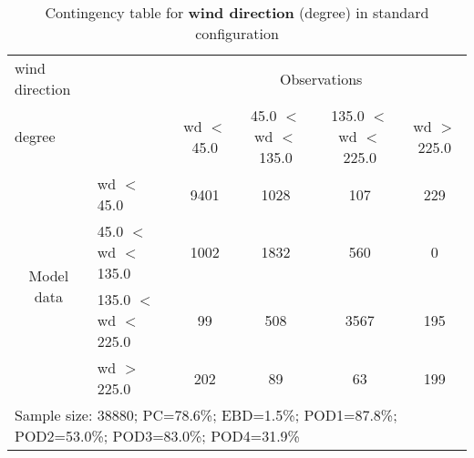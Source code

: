 \documentclass[11pt,english]{article}
\begin{document}
\begin{table}[]
\begin{center}
\begin{tabular}{llcccc}
\hline
{wind direction}                                       &                                                    & \multicolumn{4}{c}{Observations}                 \\
{degree}                                       &                             & wd $<$ 45.0   & 45.0 $<$ wd $<$ 135.0 & 135.0 $<$ wd $<$ 225.0 & wd $>$ 225.0 \\
\hline
\multicolumn{1}{c}{\multirow{4}{*}{Model data}}  & wd $<$ 45.0              & 9401   & 1028    & 107     & 229\\
                                                 & 45.0 $<$ wd $<$ 135.0  & 1002   & 1832    & 560     & 0\\
                                                 & 135.0 $<$ wd $<$ 225.0  & 99   & 508   & 3567    & 195\\
                                                 & wd $>$ 225.0              & 202  & 89   & 63    & 199\\
\hline 
\multicolumn{6}{l}{Sample size: 38880; PC=78.6\%; EBD=1.5\%; POD1=87.8\%; POD2=53.0\%; POD3=83.0\%; POD4=31.9\%}                 \\
\end{tabular}
\end{center}
\caption{Contingency table for \textbf{wind direction} (degree) in standard configuration}
\label{tab:contingencywdBEF}
\end{table}
\end{document}
